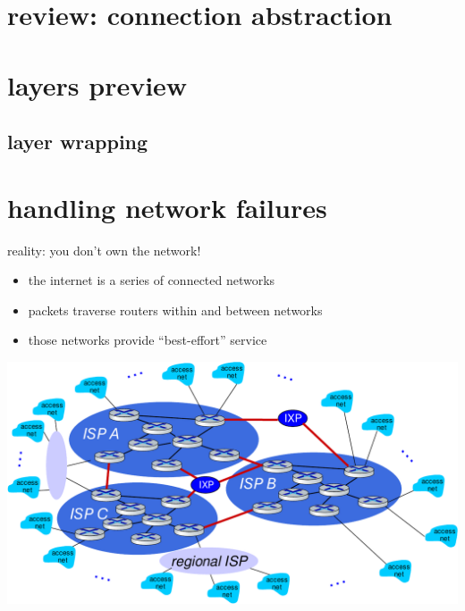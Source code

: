 \section{review: connection abstraction}



\section{layers preview}


\subsection{layer wrapping}


\section{handling network failures}

\begin{frame}{reality: you don't own the network!}
    \begin{itemize}
    \item the internet is a series of connected networks
    \item packets traverse routers within and between networks
    \item those networks provide ``best-effort'' service
    \end{itemize}
    \begin{center}
        \includegraphics[width=0.4\pagewidth]{../network/network-of-network}
    \end{center}
\end{frame}



